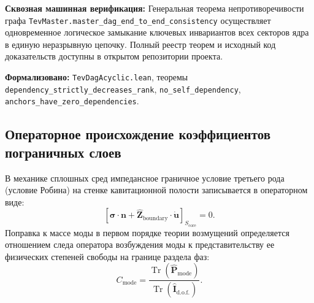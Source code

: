 \documentclass[11pt,a4paper]{article}
\theoremstyle{definition}
\theoremstyle{remark}
\begin{document}
\noindent\small\textbf{Сквозная машинная верификация:} Генеральная теорема непротиворечивости графа \texttt{TevMaster.master\_dag\_end\_to\_end\_consistency} осуществляет одновременное логическое замыкание ключевых инвариантов всех секторов ядра в единую неразрывную цепочку. Полный реестр теорем и исходный код доказательств доступны в открытом репозитории проекта.

\noindent\small\textbf{Формализовано:} \texttt{TevDagAcyclic.lean}, теоремы \texttt{dependency\_strictly\_decreases\_rank}, \texttt{no\_self\_dependency}, \texttt{anchors\_have\_zero\_dependencies}.

\subsection{Операторное происхождение коэффициентов пограничных слоев}

В механике сплошных сред импедансное граничное условие третьего рода (условие Робина) на стенке кавитационной полости записывается в операторном виде:
\begin{equation}
	\left[ \boldsymbol{\sigma} \cdot \mathbf{n} + \hat{\mathbf{Z}}_{\mathrm{boundary}} \cdot \dot{\mathbf{u}} \right]_{S_{\mathrm{core}}} = 0.
\end{equation}
Поправка к массе моды в первом порядке теории возмущений определяется отношением следа оператора возбуждения моды к представительству ее физических степеней свободы на границе раздела фаз:
\begin{equation}
	C_{\mathrm{mode}} = \frac{\operatorname{Tr}(\hat{\mathbf{P}}_{\mathrm{mode}})}{\operatorname{Tr}(\hat{\mathbf{I}}_{\mathrm{d.o.f.}})}.
\end{equation}
\end{document}
